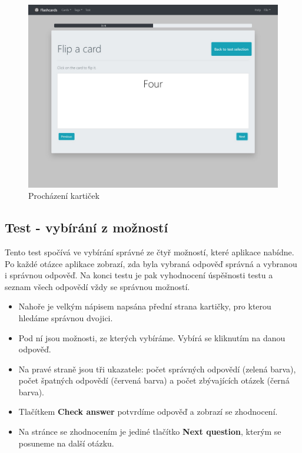 \documentclass[11pt]{article}
\providecommand{\tightlist}{\setlength{\itemsep}{1pt}\setlength{\parskip}{1pt}}
\begin{document}
\begin{figure}
\centering
\includegraphics{../../../../assets/browse.jpg}
\caption{Procházení kartiček}
\end{figure}

\hypertarget{test---vybuxedruxe1nuxed-z-moux17enostuxed}{%
\subsection{Test - vybírání z
možností}\label{test---vybuxedruxe1nuxed-z-moux17enostuxed}}

Tento test spočívá ve vybírání správné ze čtyř možností, které aplikace
nabídne. Po každé otázce aplikace zobrazí, zda byla vybraná odpověď
správná a vybranou i správnou odpověď. Na konci testu je pak vyhodnocení
úspěšnosti testu a seznam všech odpovědí vždy se správnou možností.

\begin{itemize}
\tightlist
\item
  Nahoře je velkým nápisem napsána přední strana kartičky, pro kterou
  hledáme správnou dvojici.
\item
  Pod ní jsou možnosti, ze kterých vybíráme. Vybírá se kliknutím na
  danou odpověď.
\item
  Na pravé straně jsou tři ukazatele: počet správných odpovědí (zelená
  barva), počet špatných odpovědí (červená barva) a počet zbývajících
  otázek (černá barva).
\item
  Tlačítkem \textbf{Check answer} potvrdíme odpověď a zobrazí se
  zhodnocení.
\item
  Na stránce se zhodnocením je jediné tlačítko \textbf{Next question},
  kterým se posuneme na další otázku.
\end{itemize}
\end{document}
